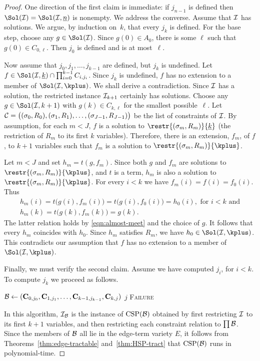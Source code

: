 \begin{proof}
One direction of the first claim is immediate: if $j_{n-1}$ is defined then $\Sol(\sI)= \Sol(\sI,\nn)
$ is nonempty. We address the converse. Assume that $\mathcal{I}$ has solutions. We argue, by 
induction on~$k$, that every $j_k$ is defined. For the base step, choose any $g\in \Sol(\sI)$.  
Since $g(0) \in A_0$, there is some $\ell$ such that $g(0) \in C_{0,\ell}$. Then $j_0$ is 
defined and is at most~$\ell$.

Now assume that $j_0, j_1,\dots,j_{k-1}$ are defined, but $j_k$ is undefined. Let $f\in \Sol(\sI,
\kk)\cap \prod_{i=0}^{k-1} C_{i,j_i}$. Since $j_k$ is undefined, $f$ has no extension to a 
member of $\Sol(\sI,\kplus)$. We shall derive a contradiction. Since $\mathcal{I}$ has a solution, 
the restricted instance $\mathcal{I}_{k+1}$ certainly has solutions. Choose any $g\in \Sol(\sI,k+1)$ with $g(k) 
\in C_{k,\ell}$ for the smallest possible~$\ell$. Let $\mathcal{C}= \bigl((\sigma_0,R_0), 
(\sigma_1,R_1),\dots,(\sigma_{J-1},R_{J-1})\bigr)$ be the list of constraints of $\mathcal{I}$. 
By assumption, for each $m<J$, $f$ is a solution to $\restr{(\sigma_m,R_m)}{\kk}$ (the 
restriction of $R_m$ to its first $k$ variables). Therefore, there is an extension, $f_m$, of $f$, 
to $k+1$ variables such that $f_m$ is a solution to $\restr{(\sigma_m,R_m)}{\kplus}$. 

Let $m<J$ and set $h_m = t(g,f_m)$. Since both $g$ and $f_m$ are 
solutions to $\restr{(\sigma_m,R_m)}{\kplus}$, and $t$ is a term, $h_m$ is also a solution to $\restr{(\sigma_m,R_m)}{\kplus}$. 
For every $i<k$ we have $f_m(i)= f(i) = f_0(i)$. Thus 
\begin{gather*}
h_m(i) = t\bigl(g(i), f_m(i)\bigr) = t\bigl(g(i),f_0(i)\bigr) = h_0(i), \text{ for $i<k$ and}\\
h_m(k) = t\bigl(g(k),f_m(k)\bigr) = g(k).
\end{gather*}
The latter relation holds by \eqref{eqn:almost-meet} 
and the choice of $g$. It follows that every $h_m$ coincides with $h_0$. Since $h_m$ satisfies 
$R_m$, we have $h_0 \in \Sol(\sI,\kplus)$. This contradicts our assumption that $f$ has no 
extension to a member of $\Sol(\sI,\kplus)$. 

Finally, we must verify the second claim. Assume we have computed $j_i$, for $i<k$. To 
compute $j_k$ we proceed as follows.
\begin{algorithmic}
 \State $\mathcal{B} \leftarrow (\mathbf{C}_{0,j_0}, \mathbf{C}_{1,j_1}, \dots, \mathbf{C}_{k-1,j_{k-1}},\mathbf{C}_{k,j})$
 \Return $j$
 \EndIf
 \EndFor
 \Return \textsc{Failure}
 \end{algorithmic}
 In this algorithm, $\mathcal{I}_{\mathcal{B}}$ is the instance of $\operatorname{CSP}(\mathcal{B})$ obtained by first restricting $\mathcal{I}$ to 
 its first $k+1$ variables, and then restricting each constraint relation to $\prod\mathcal{B}$. Since the 
members of $\mathcal{B}$ all lie in the edge-term variety $E$, it follows from 
Theorems~\ref{thm:edge-tractable} and~\ref{thm:HSP-tract} that $\operatorname{CSP}(\mathcal{B})$ runs in polynomial-time. 
 \end{proof}
 

